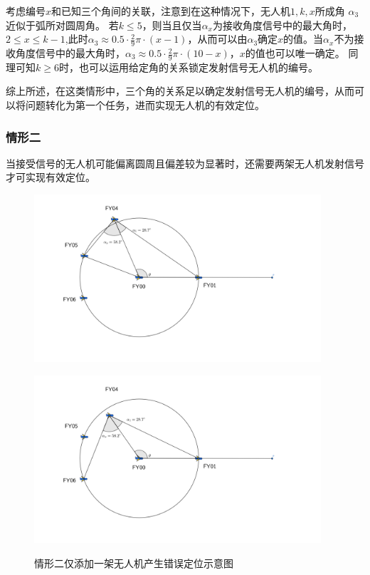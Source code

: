 \documentclass[withoutpreface,bwprint]{cumcmthesis} %
\begin{document}
考虑编号$x$和已知三个角间的关联，注意到在这种情况下，无人机$1,k,x$所成角
$\alpha_3$近似于弧所对圆周角。
若$k\le5$，则当且仅当$\alpha_x$为接收角度信号中的最大角时，
$2 \leq x \leq k-1$,此时$\alpha_3\approx0.5 \cdot \frac{2}{9}\pi \cdot(x-1) $，从而可以由$\alpha_3$确定$x$的值。当$\alpha_x$不为接收角度信号中的最大角时，$\alpha_3\approx0.5 \cdot \frac{2}{9}\pi \cdot(10-x) $，$x$的值也可以唯一确定。
同理可知$k\geq6$时，也可以运用给定角的关系锁定发射信号无人机的编号。

综上所述，在这类情形中，三个角的关系足以确定发射信号无人机的编号，从而可以将问题转化为第一个任务，进而实现无人机的有效定位。

\subsubsection{情形二}

当接受信号的无人机可能偏离圆周且偏差较为显著时，还需要两架无人机发射信号才可实现有效定位。

\begin{figure}[H]
    \centering
    \begin{minipage}[c]{0.9\textwidth}
        \centering
        \includegraphics[width=0.95\textwidth]{figures/T2 fig1.png}
        \label{fig:sample-figure-a}
    \end{minipage}
    \begin{minipage}[c]{0.95\textwidth}
        \centering
        \includegraphics[width=0.95\textwidth]{figures/T2 fig2.png}
        \label{fig:sample-figure-b}
    \end{minipage}
    \caption{情形二仅添加一架无人机产生错误定位示意图}
    \label{fig:comparison}
\end{figure}
\end{document}
